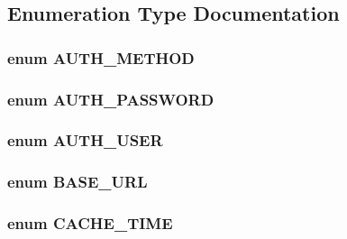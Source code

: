 \subsection{Enumeration Type Documentation}
\hypertarget{config_8inc_8php_2ee7e30fa45253c5e303994703d3293f}{
\subsubsection[{AUTH\_\-METHOD}]{\setlength{\rightskip}{0pt plus 5cm}enum {\bf AUTH\_\-METHOD}}}
\label{config_8inc_8php_2ee7e30fa45253c5e303994703d3293f}


\hypertarget{config_8inc_8php_df2112da607b39714ba9cca31b42a93a}{
\subsubsection[{AUTH\_\-PASSWORD}]{\setlength{\rightskip}{0pt plus 5cm}enum {\bf AUTH\_\-PASSWORD}}}
\label{config_8inc_8php_df2112da607b39714ba9cca31b42a93a}


\hypertarget{config_8inc_8php_7d3a74ff015a9f789a5a2e554a9fa956}{
\subsubsection[{AUTH\_\-USER}]{\setlength{\rightskip}{0pt plus 5cm}enum {\bf AUTH\_\-USER}}}
\label{config_8inc_8php_7d3a74ff015a9f789a5a2e554a9fa956}


\hypertarget{config_8inc_8php_16548ab75ed30cbddce178d56d26dbb8}{
\subsubsection[{BASE\_\-URL}]{\setlength{\rightskip}{0pt plus 5cm}enum {\bf BASE\_\-URL}}}
\label{config_8inc_8php_16548ab75ed30cbddce178d56d26dbb8}


\hypertarget{config_8inc_8php_fc454c0433a87811735836800fe3350b}{
\subsubsection[{CACHE\_\-TIME}]{\setlength{\rightskip}{0pt plus 5cm}enum {\bf CACHE\_\-TIME}}}
\label{config_8inc_8php_fc454c0433a87811735836800fe3350b}


